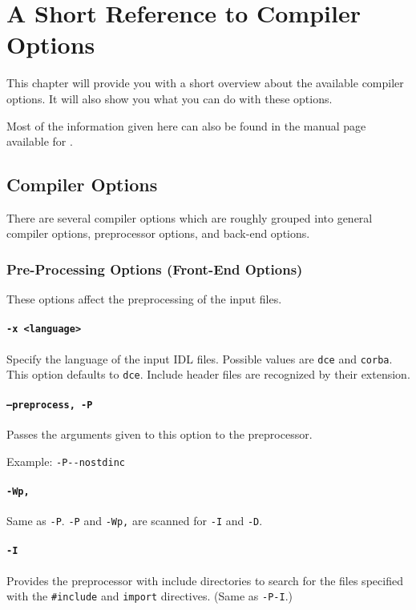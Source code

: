 \chapter{A Short Reference to Compiler Options}

This chapter will provide you with a short overview about the available
compiler options. It will also show you what you can do with these 
options.

Most of the information given here can also be found in the manual
page available for \dice{}.

\section{Compiler Options}
There are several compiler options which are roughly grouped
into general compiler options, preprocessor options, and back-end
options.

\subsection{Pre-Processing Options (Front-End Options)}
These options affect the preprocessing of the input files.

\subsubsection{{\tt -x <language>}}
Specify the language of the input IDL files. Possible values are {\tt dce} and
{\tt corba}. This option defaults to {\tt dce}. Include header files are
recognized by their extension.

\subsubsection{{\tt --preprocess, -P}}
Passes the arguments given to this option to the preprocessor.

Example: \verb|-P--nostdinc|

\subsubsection{{\tt -Wp,}}
Same as {\tt -P}. {\tt -P} and {\tt -Wp,} are scanned for
{\tt -I} and {\tt -D}.

\subsubsection{{\tt -I}}
Provides the preprocessor with include directories to search
for the files specified with the \verb|#include| and \verb|import|
directives. (Same as {\tt -P-I}.)

